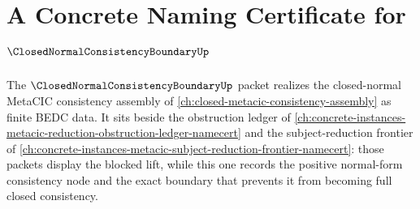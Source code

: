 \chapter{A Concrete Naming Certificate for $\ClosedNormalConsistencyBoundaryUp$}
\label{ch:concrete-instances-closed-normal-consistency-boundary-namecert}

The $\ClosedNormalConsistencyBoundaryUp$ packet realizes the closed-normal MetaCIC consistency assembly of \autoref{ch:closed-metacic-consistency-assembly} as finite BEDC data. It sits beside the obstruction ledger of \autoref{ch:concrete-instances-metacic-reduction-obstruction-ledger-namecert} and the subject-reduction frontier of \autoref{ch:concrete-instances-metacic-subject-reduction-frontier-namecert}: those packets display the blocked lift, while this one records the positive normal-form consistency node and the exact boundary that prevents it from becoming full closed consistency.

